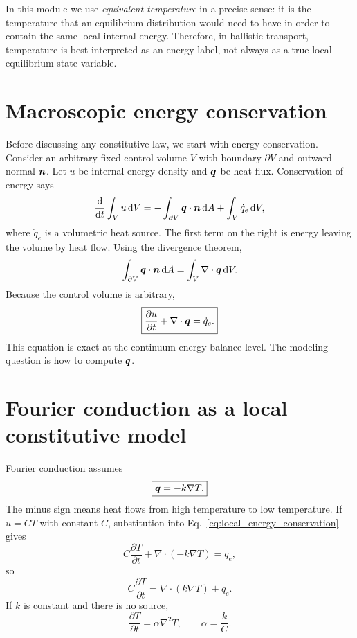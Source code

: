 \documentclass[11pt]{article}
\begin{document}
In this module we use \emph{equivalent temperature} in a precise sense: it is the temperature that an equilibrium distribution would need to have in order to contain the same local internal energy. Therefore, in ballistic transport, temperature is best interpreted as an energy label, not always as a true local-equilibrium state variable.

\section{Macroscopic energy conservation}
Before discussing any constitutive law, we start with energy conservation. Consider an arbitrary fixed control volume \(V\) with boundary \(\partial V\) and outward normal \(\bm{n}\). Let \(u\) be internal energy density and \(\bm{q}\) be heat flux. Conservation of energy says
\begin{equation}
    \frac{\dd}{\dd t}\int_V u\,\dd V
    =-\int_{\partial V}\bm{q}\cdot\bm{n}\,\dd A
    +\int_V \dot{q}_e\,\dd V,
\end{equation}
where \(\dot{q}_e\) is a volumetric heat source. The first term on the right is energy leaving the volume by heat flow. Using the divergence theorem,
\begin{equation}
    \int_{\partial V}\bm{q}\cdot\bm{n}\,\dd A
    =\int_V \nabla\cdot\bm{q}\,\dd V.
\end{equation}
Because the control volume is arbitrary,
\begin{equation}
    \boxed{\frac{\partial u}{\partial t}+\nabla\cdot\bm{q}=\dot{q}_e.}
    \label{eq:local_energy_conservation}
\end{equation}
This equation is exact at the continuum energy-balance level. The modeling question is how to compute \(\bm{q}\).

\section{Fourier conduction as a local constitutive model}
Fourier conduction assumes
\begin{equation}
    \boxed{\bm{q}=-k\nabla T.}
    \label{eq:fourier_law}
\end{equation}
The minus sign means heat flows from high temperature to low temperature. If \(u=C T\) with constant \(C\), substitution into Eq.~\eqref{eq:local_energy_conservation} gives
\begin{equation}
    C\frac{\partial T}{\partial t}+\nabla\cdot(-k\nabla T)=\dot{q}_e,
\end{equation}
so
\begin{equation}
    \boxed{C\frac{\partial T}{\partial t}=\nabla\cdot(k\nabla T)+\dot{q}_e.}
    \label{eq:fourier_heat_equation_general}
\end{equation}
If \(k\) is constant and there is no source,
\begin{equation}
    \frac{\partial T}{\partial t}=\alpha \nabla^2T,
    \qquad
    \alpha=\frac{k}{C}.
\end{equation}
\end{document}
